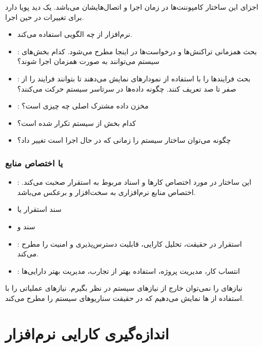 \documentclass[a4paper]{article}
\begin{document}
اجزای این ساختار کامپوننت‌ها در زمان اجرا و اتصال‌هایشان می‌باشد. یک دید پویا
دارد برای تغییرات در حین اجرا.

\begin{itemize}
    \item {} نرم‌افزار از چه الگویی استفاده می‌کند.
    \item {}: بحث همزمانی تراکنش‌ها و درخواست‌ها در اینجا مطرح
    می‌شود. کدام بخش‌های سیستم می‌توانند به صورت همزمان اجرا شوند؟
    \item {}: بحث فرایند‌ها را با استفاده از نمودار‌های 
    نمایش می‌دهند تا بتوانند فرایند را از صفر تا صد تعریف کنند. چگونه داده‌ها در
    سرتاسر سیستم حرکت می‌کنند؟
    \item {}: مخزن داده مشترک اصلی چه چیزی است؟
    \item کدام بخش از سیستم تکرار شده است؟
    \item چگونه می‌توان ساختار سیستم را زمانی که در حال اجرا است تغییر داد؟
\end{itemize}

\subsubsection{ یا اختصاص منابع}

\begin{itemize}
    \item {}: این ساختار در مورد اختصاص کار‌ها و اسناد مربوط
    به استقرار صحبت می‌کند. اختصاص منابع نرم‌افزاری به سخت‌افزار و برعکس
    می‌باشد.
    \item سند استقرار یا 
    \item سند  و 
    \item {}: استقرار در حقیقت، تحلیل کارایی، قابلیت دسترس‌پذیری و
    امنیت را مطرح می‌کند.
    \item {}: انتساب کار، مدیریت پروژه، استفاده بهتر از تجارب،
    مدیریت بهتر دارایی‌ها
\end{itemize}

نیاز‌های  را نمی‌توان خارج از نیاز‌های  سیستم در نظر بگیرم.
نیاز‌های عملیاتی را با استفاده از ها نمایش می‌دهیم که در حقیقت
سناریو‌های سیستم را مطرح می‌کند.

\section{اندازه‌گیری کارایی نرم‌افزار}
\end{document}
